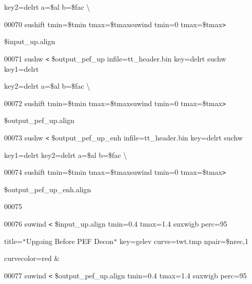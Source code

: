 \documentclass{article}
\begin{document}
\vspace{4pt}
\parindent=18pt
key2=delrt a=\$al b=\$fac \textbackslash{}

\vspace{4pt}
\parindent=0pt
00070            \textbar{} sushift tmin=\$tmin tmax=\$tmax\textbar{}suwind tmin=0 
tmax=\$tmax\texttt{>} 

\vspace{4pt}
\parindent=18pt
\$input\_up.align

\vspace{4pt}
\parindent=0pt
00071 sushw \texttt{<} \$output\_pef\_up infile=tt\_header.bin key=delrt \textbar{} 
suchw key1=delrt 

\vspace{4pt}
\parindent=18pt
key2=delrt a=\$al b=\$fac \textbackslash{}

\vspace{4pt}
\parindent=0pt
00072            \textbar{} sushift tmin=\$tmin tmax=\$tmax\textbar{}suwind tmin=0 
tmax=\$tmax\texttt{>} 

\vspace{4pt}
\parindent=18pt
\$output\_pef\_up.align

\vspace{4pt}
\parindent=0pt
00073 sushw \texttt{<} \$output\_pef\_up\_enh infile=tt\_header.bin key=delrt \textbar{} 
suchw 

\vspace{4pt}
\parindent=18pt
key1=delrt key2=delrt a=\$al b=\$fac \textbackslash{}

\vspace{4pt}
\parindent=0pt
00074            \textbar{} sushift tmin=\$tmin tmax=\$tmax\textbar{}suwind tmin=0 
tmax=\$tmax\texttt{>} 

\vspace{4pt}
\parindent=18pt
\$output\_pef\_up\_enh.align

\vspace{4pt}
\parindent=0pt
00075 

\vspace{4pt}
00076 suwind \texttt{<} \$input\_up.align tmin=0.4 tmax=1.4 \textbar{} suxwigb 
perc=95 

\vspace{4pt}
title=\texttt{"}Upgoing  Before PEF Decon\texttt{"} key=gelev curve=twt.tmp npair=\$nrec,1 

\vspace{4pt}
curvecolor=red \&

\vspace{4pt}
00077 suwind \texttt{<} \$output\_pef\_up.align tmin=0.4 tmax=1.4 \textbar{} suxwigb 
perc=95 
\end{document}
